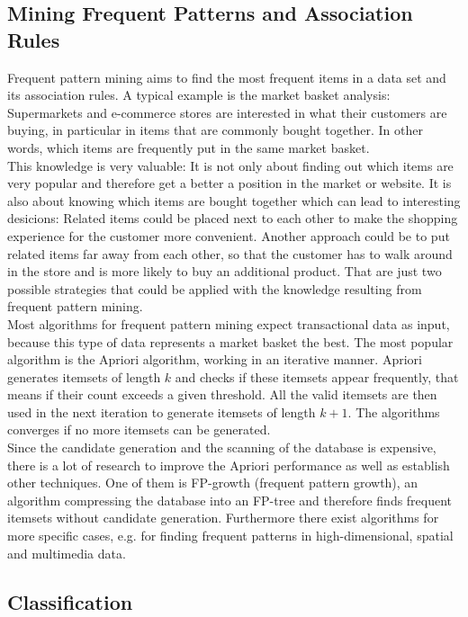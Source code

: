 \subsection{Mining Frequent Patterns and Association Rules}
Frequent pattern mining aims to find the most frequent items in a data set and its association rules. A typical example is the market basket analysis: Supermarkets and e-commerce stores are interested in what their customers are buying, in particular in items that are commonly bought together. In other words, which items are frequently put in the same market basket. 
\\
This knowledge is very valuable: It is not only about finding out which items are very popular and therefore get a better a position in the market or website. It is also about knowing which items are bought together which can lead to interesting desicions: Related items could be placed next to each other to make the shopping experience for the customer more convenient. Another approach could be to put related items far away from each other, so that the customer has to walk around in the store and is more likely to buy an additional product. That are just two possible strategies that could be applied with the knowledge resulting from frequent pattern mining.
\\
Most algorithms for frequent pattern mining expect transactional data as input, because this type of data represents a market basket the best. The most popular algorithm is the Apriori algorithm, working in an iterative manner. Apriori generates itemsets of length $k$ and checks if these itemsets appear frequently, that means if their count exceeds a given threshold. All the valid itemsets are then used in the next iteration to generate itemsets of length $k+1$. The algorithms converges if no more itemsets can be generated.
\\
Since the candidate generation and the scanning of the database is expensive, there is a lot of research to improve the Apriori performance as well as establish other techniques. One of them is FP-growth (frequent pattern growth), an algorithm compressing the database into an FP-tree and therefore finds frequent itemsets without candidate generation. Furthermore there exist algorithms for more specific cases, e.g. for finding frequent patterns in high-dimensional, spatial and multimedia data.

\subsection{Classification}

